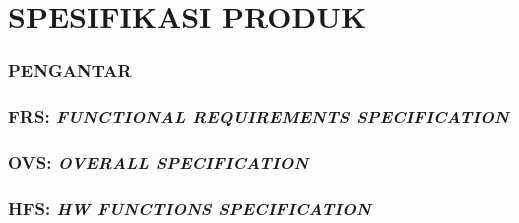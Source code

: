 \part*{\centering\textsf{\large SPESIFIKASI PRODUK}}


\section*{\textcolor{sectioncolor}{\textsf{\large PENGANTAR}}}







\section*{\textcolor{sectioncolor}{\textsf{\large FRS: \textit{FUNCTIONAL REQUIREMENTS SPECIFICATION}}}}










\section*{\textcolor{sectioncolor}{\textsf{\large OVS: \textit{OVERALL SPECIFICATION}}}}











\section*{\textcolor{sectioncolor}{\textsf{\large HFS: \textit{HW FUNCTIONS SPECIFICATION}}}}


